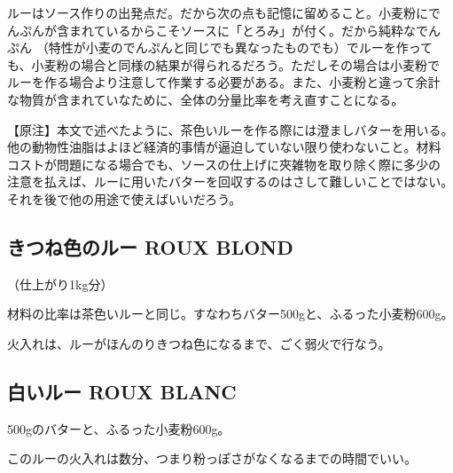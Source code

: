 \documentclass[twoside,12Q,b5paper]{escoffierltjsbook}
\newenvironment{recette}{\begin{multicols}{2}}{\end{multicols}}
\begin{document}
\begin{recette}
ルーはソース作りの出発点だ。だから次の点も記憶に留めること。小麦粉にで
んぷんが含まれているからこそソースに「とろみ」が付く。だから純粋なでん
ぷん （特性が小麦のでんぷんと同じでも異なったものでも）でルーを作って
も、小麦粉の場合と同様の結果が得られるだろう。ただしその場合は小麦粉で
ルーを作る場合より注意して作業する必要がある。また、小麦粉と違って余計
な物質が含まれていなために、全体の分量比率を考え直すことになる。

【原注】本文で述べたように、茶色いルーを作る際には澄ましバターを用いる。
他の動物性油脂はよほど経済的事情が逼迫していない限り使わないこと。材料
コストが問題になる場合でも、ソースの仕上げに夾雑物を取り除く際に多少の
注意を払えば、ルーに用いたバターを回収するのはさして難しいことではない。
それを後で他の用途で使えばいいだろう。

\subsection{きつね色のルー ROUX
BLOND}\label{ux304dux3064ux306dux8272ux306eux30ebux30fc-roux-blond}

（仕上がり1kg分）

材料の比率は茶色いルーと同じ。すなわちバター500gと、ふるった小麦粉600g。

火入れは、ルーがほんのりきつね色になるまで、ごく弱火で行なう。

\subsection{白いルー ROUX
BLANC}\label{ux767dux3044ux30ebux30fc-roux-blanc}

500gのバターと、ふるった小麦粉600g。

このルーの火入れは数分、つまり粉っぽさがなくなるまでの時間でいい。

\end{recette}



\end{document}
